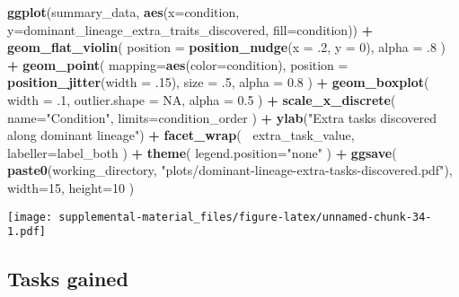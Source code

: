 \documentclass[]{book}
\newenvironment{Shaded}{\begin{snugshade}}{\end{snugshade}}
\newcommand{\DataTypeTok}[1]{\textcolor[rgb]{0.13,0.29,0.53}{#1}}
\newcommand{\DecValTok}[1]{\textcolor[rgb]{0.00,0.00,0.81}{#1}}
\newcommand{\FloatTok}[1]{\textcolor[rgb]{0.00,0.00,0.81}{#1}}
\newcommand{\KeywordTok}[1]{\textcolor[rgb]{0.13,0.29,0.53}{\textbf{#1}}}
\newcommand{\NormalTok}[1]{#1}
\newcommand{\OperatorTok}[1]{\textcolor[rgb]{0.81,0.36,0.00}{\textbf{#1}}}
\newcommand{\OtherTok}[1]{\textcolor[rgb]{0.56,0.35,0.01}{#1}}
\newcommand{\StringTok}[1]{\textcolor[rgb]{0.31,0.60,0.02}{#1}}
\begin{document}
\begin{Shaded}
\begin{Highlighting}[]
\KeywordTok{ggplot}\NormalTok{(summary_data, }\KeywordTok{aes}\NormalTok{(}\DataTypeTok{x=}\NormalTok{condition, }\DataTypeTok{y=}\NormalTok{dominant_lineage_extra_traits_discovered, }\DataTypeTok{fill=}\NormalTok{condition)) }\OperatorTok{+}
\StringTok{  }\KeywordTok{geom_flat_violin}\NormalTok{(}
    \DataTypeTok{position =} \KeywordTok{position_nudge}\NormalTok{(}\DataTypeTok{x =} \FloatTok{.2}\NormalTok{, }\DataTypeTok{y =} \DecValTok{0}\NormalTok{),}
    \DataTypeTok{alpha =} \FloatTok{.8}
\NormalTok{  ) }\OperatorTok{+}
\StringTok{  }\KeywordTok{geom_point}\NormalTok{(}
    \DataTypeTok{mapping=}\KeywordTok{aes}\NormalTok{(}\DataTypeTok{color=}\NormalTok{condition),}
    \DataTypeTok{position =} \KeywordTok{position_jitter}\NormalTok{(}\DataTypeTok{width =} \FloatTok{.15}\NormalTok{),}
    \DataTypeTok{size =} \FloatTok{.5}\NormalTok{,}
    \DataTypeTok{alpha =} \FloatTok{0.8}
\NormalTok{  ) }\OperatorTok{+}
\StringTok{  }\KeywordTok{geom_boxplot}\NormalTok{(}
    \DataTypeTok{width =} \FloatTok{.1}\NormalTok{,}
    \DataTypeTok{outlier.shape =} \OtherTok{NA}\NormalTok{,}
    \DataTypeTok{alpha =} \FloatTok{0.5}
\NormalTok{  ) }\OperatorTok{+}
\StringTok{  }\KeywordTok{scale_x_discrete}\NormalTok{(}
    \DataTypeTok{name=}\StringTok{"Condition"}\NormalTok{,}
    \DataTypeTok{limits=}\NormalTok{condition_order}
\NormalTok{  ) }\OperatorTok{+}
\StringTok{  }\KeywordTok{ylab}\NormalTok{(}\StringTok{"Extra tasks discovered along dominant lineage"}\NormalTok{) }\OperatorTok{+}
\StringTok{  }\KeywordTok{facet_wrap}\NormalTok{(}
    \OperatorTok{~}\NormalTok{extra_task_value,}
    \DataTypeTok{labeller=}\NormalTok{label_both}
\NormalTok{  ) }\OperatorTok{+}
\StringTok{  }\KeywordTok{theme}\NormalTok{(}
    \DataTypeTok{legend.position=}\StringTok{"none"}
\NormalTok{  ) }\OperatorTok{+}
\StringTok{  }\KeywordTok{ggsave}\NormalTok{(}
    \KeywordTok{paste0}\NormalTok{(working_directory, }\StringTok{"plots/dominant-lineage-extra-tasks-discovered.pdf"}\NormalTok{),}
    \DataTypeTok{width=}\DecValTok{15}\NormalTok{,}
    \DataTypeTok{height=}\DecValTok{10}
\NormalTok{  )}
\end{Highlighting}
\end{Shaded}

\texttt{[image: supplemental-material\_files/figure-latex/unnamed-chunk-34-1.pdf]}

\hypertarget{tasks-gained}{%
\subsection{Tasks gained}\label{tasks-gained}}
\end{document}
